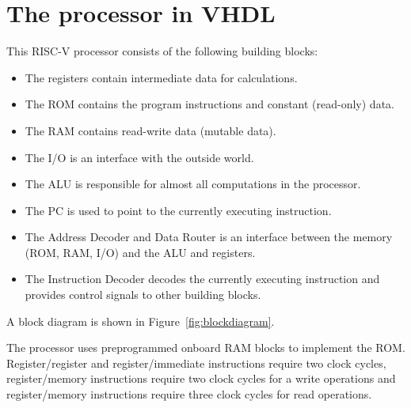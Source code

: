 \documentclass[12pt]{article}
\begin{document}
\section{The processor in VHDL}
This RISC-V processor consists of the following building blocks:

\begin{itemize}
\item The registers contain intermediate data for calculations.
\item The ROM contains the program instructions and constant (read-only) data.
\item The RAM contains read-write data (mutable data).
\item The I/O is an interface with the outside world.
\item The ALU is responsible for almost all computations in the processor.
\item The PC is used to point to the currently executing instruction.
\item The Address Decoder and Data Router is an interface between the memory (ROM, RAM, I/O) and the ALU and registers.
\item The Instruction Decoder decodes the currently executing instruction and provides control signals to other building blocks.
\end{itemize}

A block diagram is shown in Figure~\ref{fig:blockdiagram}.

The processor uses preprogrammed onboard RAM blocks to implement the ROM. Register/register and register/immediate instructions require two clock cycles, register/memory instructions require two clock cycles for a write operations and register/memory instructions require three clock cycles for read operations.
 
\end{document}
